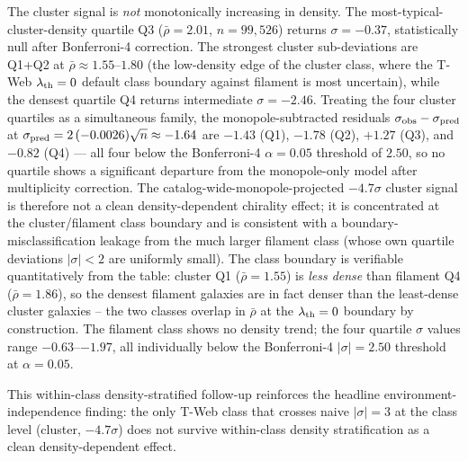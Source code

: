 \documentclass[aps,prd,twocolumn,superscriptaddress,showpacs,preprintnumbers,nofootinbib,longbibliography,floatfix]{revtex4-2}
\begin{document}
The cluster signal is \emph{not} monotonically increasing in density.
The most-typical-cluster-density quartile Q3 ($\bar\rho = 2.01$,
$n = 99{,}526$) returns $\sigma = -0.37$, statistically null after
Bonferroni-4 correction. The strongest cluster sub-deviations are
Q1+Q2 at $\bar\rho \approx 1.55$--$1.80$ (the low-density edge of
the cluster class, where the T-Web $\lambda_{\rm th} = 0$ default
class boundary against filament is most uncertain), while the densest
quartile Q4 returns intermediate $\sigma = -2.46$. Treating the four
cluster quartiles as a simultaneous family, the monopole-subtracted
residuals $\sigma_{\rm obs} - \sigma_{\rm pred}$ at
$\sigma_{\rm pred} = 2\,(-0.0026)\sqrt{n} \approx -1.64$ are $-1.43$
(Q1), $-1.78$ (Q2), $+1.27$ (Q3), and $-0.82$ (Q4) --- all four below
the Bonferroni-4 $\alpha = 0.05$ threshold of $2.50$, so no quartile
shows a significant departure from the monopole-only model after
multiplicity correction. The catalog-wide-monopole-projected
$-4.7\sigma$ cluster signal is therefore not a clean density-dependent
chirality effect; it is concentrated at the cluster/filament class
boundary and is consistent with a boundary-misclassification leakage
from the much larger filament class (whose own quartile deviations
$|\sigma| < 2$ are uniformly small). The class boundary is verifiable
quantitatively from the table: cluster Q1 ($\bar\rho = 1.55$) is
\emph{less dense} than filament Q4 ($\bar\rho = 1.86$), so the
densest filament galaxies are in fact denser than the least-dense
cluster galaxies -- the two classes overlap in $\bar\rho$ at the
$\lambda_{\rm th} = 0$ boundary by construction. The filament class shows no
density trend; the four quartile $\sigma$ values range
$-0.63$--$-1.97$, all individually below the Bonferroni-4 $|\sigma| =
2.50$ threshold at $\alpha = 0.05$.

This within-class density-stratified follow-up reinforces the
headline environment-independence finding: the only T-Web class that
crosses naive $|\sigma| = 3$ at the class level (cluster, $-4.7\sigma$)
does not survive within-class density stratification as a clean
density-dependent effect.
\end{document}
